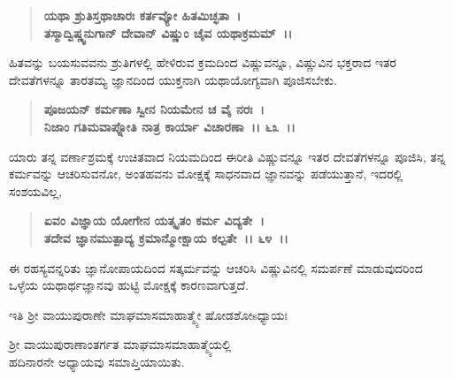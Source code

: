 \begin{verse}
\textbf{ಯಥಾ ಶ್ರುತಿಸ್ತಥಾಚಾರಃ ಕರ್ತವ್ಯೋ ಹಿತಮಿಚ್ಛತಾ~।}\\\textbf{ತಸ್ಮಾದ್ವಿಷ್ಣ್ವನುಗಾನ್ ದೇವಾನ್ ವಿಷ್ಣುಂ ಚೈವ ಯಥಾಕ್ರಮಮ್~।।}
\end{verse}

ಹಿತವನ್ನು ಬಯಸುವವನು ಶ್ರುತಿಗಳಲ್ಲಿ ಹೇಳಿರುವ ಕ್ರಮದಿಂದ ವಿಷ್ಣುವನ್ನೂ, ವಿಷ್ಣುವಿನ ಭಕ್ತರಾದ ಇತರ ದೇವತೆಗಳನ್ನೂ ತಾರತಮ್ಯ ಜ್ಞಾನದಿಂದ ಯುಕ್ತನಾಗಿ ಯಥಾಯೋಗ್ಯವಾಗಿ ಪೂಜಿಸಬೇಕು.

\begin{verse}
\textbf{ಪೂಜಯನ್ ಕರ್ಮಣಾ ಸ್ವೀನ ನಿಯಮೇನ ಚ ವೈ ನರಃ~।}\\\textbf{ನಿಜಾಂ ಗತಿಮವಾಪ್ನೋತಿ ನಾತ್ರ ಕಾರ್ಯಾ ವಿಚಾರಣಾ~।। ೬೩~।।}
\end{verse}

ಯಾರು ತನ್ನ ವರ್ಣಾಶ್ರಮಕ್ಕೆ ಉಚಿತವಾದ ನಿಯಮದಿಂದ ಈರೀತಿ ವಿಷ್ಣುವನ್ನೂ ಇತರ ದೇವತೆಗಳನ್ನೂ ಪೂಜಿಸಿ, ತನ್ನ ಕರ್ಮವನ್ನು ಆಚರಿಸುವನೋ, ಅಂತಹವನು ಮೋಕ್ಷಕ್ಕೆ ಸಾಧನವಾದ ಜ್ಞಾನವನ್ನು ಪಡೆಯುತ್ತಾನೆ, ಇದರಲ್ಲಿ ಸಂಶಯವಿಲ್ಲ,

\begin{verse}
\textbf{ಏವಂ ವಿಜ್ಞಾಯ ಯೋಗೇನ ಯತ್ಕೃತಂ ಕರ್ಮ ವಿದ್ಯತೇ~।}\\\textbf{ತದೇವ ಜ್ಞಾನಮುತ್ಪಾದ್ಯ ಕ್ರಮಾನ್ಮೋಕ್ಷಾಯ ಕಲ್ಪತೇ~।। ೬೪~।।}
\end{verse}

ಈ ರಹಸ್ಯವನ್ನರಿತು ಜ್ಞಾನೋಪಾಯದಿಂದ ಸತ್ಕರ್ಮವನ್ನು ಆಚರಿಸಿ ವಿಷ್ಣುವಿನಲ್ಲಿ ಸಮರ್ಪಣೆ ಮಾಡುವುದರಿಂದ ಒಳ್ಳೆಯ ಯಥಾರ್ಥಜ್ಞಾನವು ಹುಟ್ಟಿ ಮೋಕ್ಷಕ್ಕೆ ಕಾರಣವಾಗುತ್ತದೆ.

\begin{center}
ಇತಿ ಶ‍್ರೀ ವಾಯುಪುರಾಣೇ ಮಾಘಮಾಸಮಾಹಾತ್ಮ್ಯೇ ಷೋಡಶೋsಧ್ಯಾಯಃ
\end{center}

\begin{center}
ಶ‍್ರೀ ವಾಯುಪುರಾಣಾಂತರ್ಗತ ಮಾಘಮಾಸಮಾಹಾತ್ಮ್ಯೆಯಲ್ಲಿ \\ ಹದಿನಾರನೇ ಅಧ್ಯಾಯವು ಸಮಾಪ್ತಿಯಾಯಿತು.
\end{center}

\delimiter

